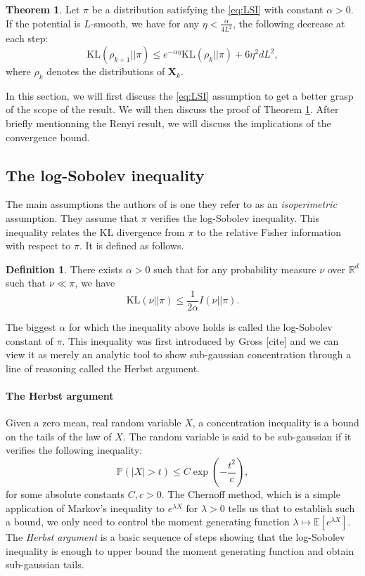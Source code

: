 \documentclass[11pt,twoside]{article}
\theoremstyle{definition}
\newtheorem{definition}{Definition}[section]
\newtheorem{theorem}{Theorem}[section]
\newcommand{\Prb}{\mathbb{P}}
\newcommand{\E}{\mathbb{E}}
\newcommand{\R}{\mathbb{R}}
\newcommand{\bX}{\mathbf{X}}
\newcommand{\KL}{\text{KL}}
\begin{document}
\begin{boxF}
\begin{theorem}
Let $\pi$ be a distribution satisfying the \eqref{eq:LSI} with constant $\alpha > 0$. If the potential is $L$-smooth, we have for any $\eta < \frac{\alpha}{4L^2}$, the following decrease at each step:
\[
\KL(\rho_{k+1} || \pi) \leq e^{-\alpha \eta}\KL(\rho_{k} || \pi) + 6\eta^2 d L^2,
\]
where $\rho_k$ denotes the distributions of $\bX_k$.
\label{thm:step}
\end{theorem}
\end{boxF}
In this section, we will first discuss the \eqref{eq:LSI} assumption to get a better grasp of the scope of the result. We will then discuss the proof of Theorem \ref{thm:step}. After briefly mentionning the Renyi result, we will discuss the implications of the convergence bound.

\subsection{The log-Sobolev inequality}

The main assumptions the authors of \cite{vempala_rapid_2019} is one they refer to as an \textit{isoperimetric} assumption. They assume that $\pi$ verifies the log-Sobolev inequality. This inequality relates the KL divergence from $\pi$ to the relative Fisher information with respect to $\pi$. It is defined as follows.

\begin{definition}
  There exists $\alpha >0$ such that for any probability measure $\nu$ over $\R^d$ such that $\nu \ll \pi$, we have
  \begin{equation}
  \KL(\nu || \pi) \leq \frac{1}{2\alpha} I(\nu || \pi).
  \label{eq:LSI}
  \tag{LSI}
  \end{equation}
\end{definition}

The biggest $\alpha$ for which the inequality above holds is called the log-Sobolev constant of $\pi$. This inequality was first introduced by Gross [cite] and we can view it as merely an analytic tool to show sub-gaussian concentration through a line of reasoning called the Herbst argument. 

\begin{boxK}
\paragraph{The Herbst argument} Given a zero mean, real random variable $X$, a concentration inequality is a bound on the tails of the law of $X$. The random variable is said to be sub-gaussian if it verifies the following inequality:
\[
\Prb(|X| > t) \leq C\exp(-\frac{t^2}{c}),
\]
for some absolute constants $C, c > 0$. The Chernoff method, which is a simple application of Markov's inequality to $e^{\lambda X}$ for $\lambda >0$ tells us that to establish such a bound, we only need to control the moment generating function $\lambda \mapsto \E[e^{\lambda X}]$. The \textit{Herbst argument} is a basic sequence of steps showing that the log-Sobolev inequality is enough to upper bound the moment generating function and obtain sub-gaussian tails.
\end{boxK} 
\end{document}
